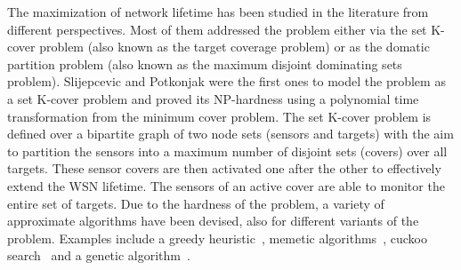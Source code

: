 \documentclass[algorithms,article,accept,moreauthors,pdftex]{Definitions/mdpi}
\begin{document}
The maximization of network lifetime has been studied in the literature from different perspectives. Most of them addressed the problem either via the set K-cover problem (also known as the target coverage problem) or as the domatic partition problem (also known as the maximum disjoint dominating sets problem). Slijepcevic and Potkonjak \cite{sliPot2001:KSC_first} were the first ones to model the problem as a set K-cover problem and proved its NP-hardness using a polynomial time transformation from the minimum cover problem. The set K-cover problem is defined over a bipartite graph of two node sets (sensors and targets) with the aim to partition the sensors into a maximum number of disjoint sets (covers) over all targets. These sensor covers are then activated one after the other to effectively extend the WSN lifetime.  The sensors of an active cover are able to monitor the entire set of targets. Due to the hardness of the problem, a variety of approximate algorithms have been devised, also for different variants of the problem. Examples include a greedy heuristic~\cite{sliPot2001:KSC_first}, memetic algorithms~\cite{wang2018:KSC_MA,lia2017:KSC_MA,chen2014:KSC_MA}, cuckoo search~\cite{balaji2020:KSC_Cuckoo} and a genetic algorithm~\cite{d2020:KSC_genetic}.
\end{document}
